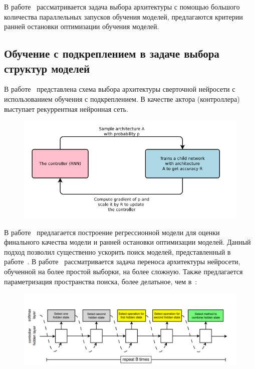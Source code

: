 В работе~\cite{optimal_racing} рассматривается задача выбора архитектуры с помощью большого количества параллельных запусков обучения моделей, предлагаются критерии ранней остановки оптимизации обучения моделей.


\subsection{ Обучение с подкреплением в задаче выбора структур моделей}
В работе~\cite{reinf} представлена схема выбора архитектуры сверточной нейросети с использованием обучения с подкреплением. В качестве актора (контроллера) выступает рекуррентная нейронная сеть.
\begin{figure}[H]
\includegraphics[width=\textwidth]{./plots/arch_review_figs/reinf.png}
\end{figure}
В работе~\cite{reinf_predict} предлагается построение регрессионной модели для оценки финального качества модели и ранней остановки оптимизации моделей. Данный подход позволил существенно ускорить поиск моделей, представленный в работе~\cite{reinf}.
В работе~\cite{reinf_transfer} рассматривается задача переноса архитектуры нейросети, обученной на более простой выборки, на более сложную. Также предлагается параметризация пространства поиска, более делатьное, чем в~\cite{reinf}:
\begin{figure}[H]
\includegraphics[width=\textwidth]{./plots/arch_review_figs/reinf2.png}
\end{figure}

